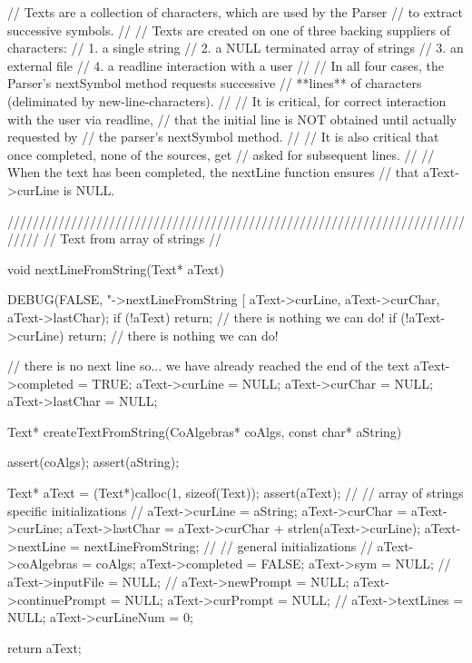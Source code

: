 // Texts are a collection of characters, which are used by the Parser
// to extract successive symbols.
//
// Texts are created on one of three backing suppliers of characters:
// 1. a single string
// 2. a NULL terminated array of strings
// 3. an external file
// 4. a readline interaction with a user
//
// In all four cases, the Parser's nextSymbol method requests successive
// **lines** of characters (deliminated by new-line-characters).
//
// It is critical, for correct interaction with the user via readline,
// that the initial line is NOT obtained until actually requested by
// the parser's nextSymbol method.
//
// It is also critical that once completed, none of the sources, get
// asked for subsequent lines.
//
// When the text has been completed, the nextLine function ensures
// that aText->curLine is NULL.

/////////////////////////////////////////////////////////////////////////////
// Text from array of strings
//

void nextLineFromString(Text* aText) {
  DEBUG(FALSE, "->nextLineFromString [%
    aText->curLine, aText->curChar, aText->lastChar);
  if (!aText) return;  // there is nothing we can do!
  if (!aText->curLine) return; // there is nothing we can do!

  // there is no next line so... we have already reached the end of the text
  aText->completed  = TRUE;
  aText->curLine    = NULL;
  aText->curChar    = NULL;
  aText->lastChar   = NULL;
}

Text* createTextFromString(CoAlgebras* coAlgs,
                           const char* aString) {
  assert(coAlgs);
  assert(aString);

  Text* aText = (Text*)calloc(1, sizeof(Text));
  assert(aText);
  //
  // array of strings specific initializations
  //
  aText->curLine    = aString;
  aText->curChar    = aText->curLine;
  aText->lastChar   = aText->curChar + strlen(aText->curLine);
  aText->nextLine   = nextLineFromString;
  //
  // general initializations
  //
  aText->coAlgebras = coAlgs;
  aText->completed  = FALSE;
  aText->sym        = NULL;
  //
  aText->inputFile = NULL;
  //
  aText->newPrompt       = NULL;
  aText->continuePrompt  = NULL;
  aText->curPrompt       = NULL;
  //
  aText->textLines  = NULL;
  aText->curLineNum = 0;

  return aText;
}
\stoptyping
